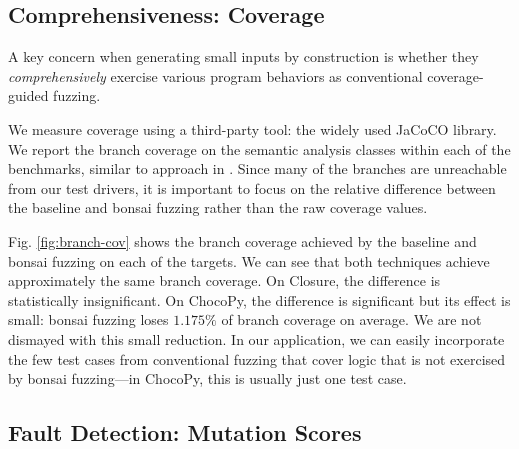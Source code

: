 \documentclass[conference]{IEEEtran}
\newcommand{\tech}{bonsai fuzzing} \newcommand{\Tech}{Bonsai fuzzing} \newcommand{\TECH}{Bonsai Fuzzing}
\begin{document}
\subsection{Comprehensiveness: Coverage}

A key concern when generating small inputs by construction is whether they \emph{comprehensively} exercise various program behaviors as conventional coverage-guided fuzzing.

We measure coverage using a third-party tool: the widely used JaCoCO library\cite{Jacoco}. We report the branch coverage on the semantic analysis classes within each of the benchmarks, similar to approach in \cite{Padhye19-zest}. Since many of the branches are unreachable from our test drivers, it is important to focus on the relative difference between the baseline and \tech{} rather than the raw coverage values.

Fig. \ref{fig:branch-cov} shows the branch coverage achieved by the baseline and \tech{} on each of the targets. We can see that both techniques achieve approximately the same branch coverage. On Closure, the difference is statistically insignificant. On ChocoPy, the difference is significant but its effect is small: \tech{} loses $1.175\%$ of branch coverage on average. We are not dismayed with this small reduction. In our application, we can easily incorporate the few test cases from conventional fuzzing that cover logic that is not exercised by \tech{}---in ChocoPy, this is usually just one test case.



\subsection{Fault Detection: Mutation Scores}
\label{sec:eval-mutation}
\end{document}
